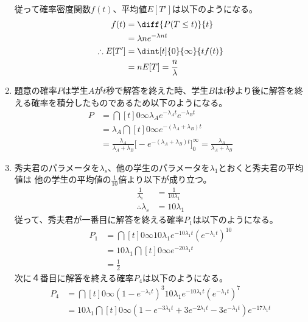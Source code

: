 \documentclass[dvipdfmx,titlepage, 11pt, a4paper]{jsarticle}%
\begin{document}
\begin{enumerate}[(1)]
\begin{align*}
        \end{align*}
        従って確率密度関数$f(t)$、平均値$E[T']$は以下のようになる。
        \begin{align*}
            f(t) &= \diff{P(T \leq t)}{t}\\
            &= \lambda n e^{- \lambda n t}\\
            \therefore E[T'] &= \dint[t]{0}{\infty}{tf(t)}\\
            &= n E[T] = \frac{n}{\lambda}\\
        \end{align*}
    \item 題意の確率$P$は学生$A$が$t$秒で解答を終えた時、学生$B$は$t$秒より後に解答を終える確率を積分したものであるため以下のようになる。
        \begin{align*}
            P &= \dint[t]{0}{\infty}{\lambda_Ae^{-\lambda_A t}e^{-\lambda_B t}}\\
            &= \lambda_A \dint[t]{0}{\infty}{e^{-(\lambda_A + \lambda_B)t}}\\
            &= \frac{\lambda_A}{\lambda_A + \lambda_B} \bigl[-e^{-(\lambda_A + \lambda_B)t}\bigr]_{0}^{\infty} 
            = \frac{\lambda_A}{\lambda_A + \lambda_B} 
        \end{align*}
    \item 秀夫君のパラメータを$\lambda_s$、他の学生のパラメータを$\lambda_1$とおくと秀夫君の平均値は
    他の学生の平均値の$\frac{1}{10}$倍より以下が成り立つ。
        \begin{align*}
            \frac{1}{\lambda_s} &= \frac{1}{10\lambda_1}\\
            \therefore \lambda_s &= 10\lambda_1
        \end{align*}
        従って、秀夫君が一番目に解答を終える確率$P_1$は以下のようになる。
        \begin{align*}
            P_1 &= \dint[t]{0}{\infty}{10\lambda_1 e^{-10\lambda_1 t}\left(e^{-\lambda_1 t}\right)^{10}}\\
            &= 10\lambda_1 \dint[t]{0}{\infty}{e^{-20\lambda_1 t}}\\
            &= \frac{1}{2}
        \end{align*}
        次に４番目に解答を終える確率$P_4$は以下のようになる。
        \begin{align*}
            P_4 &= \dint[t]{0}{\infty}{\left(1 - e^{-\lambda_1 t}\right)^{3}10\lambda_1 e^{-10\lambda_1 t}\left(e^{-\lambda_1 t}\right)^{7}}\\
            &= 10\lambda_1 \dint[t]{0}{\infty}{\left(1 - e^{-3\lambda_1 t} + 3e^{-2\lambda_1 t} - 3e^{-\lambda_1 t}\right)e^{-17\lambda_1 t}}\\

\end{align*}
\end{enumerate}
\end{document}
